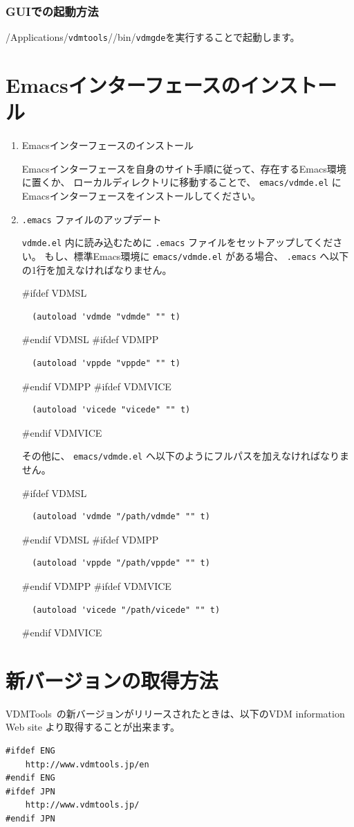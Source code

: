 \documentclass[\pformat,12pt]{jarticle}
\newcommand{\Toolbox}{VDMTools}
\newcommand{\vdmgde}{vdmgde}
\newcommand{\vdmtools}{vdmtools}
\newcommand{\vdmdeNineteenEl}{vdmde.el}
\newcommand{\Toolbox}{VDMTools}
\newcommand{\vdmgde}{vppgde}
\newcommand{\vdmtools}{vdmtools}
\newcommand{\vdmdeNineteenEl}{vppde.el}
\newcommand{\Toolbox}{VDMTools}
\newcommand{\vdmgde}{vicegde}
\newcommand{\vdmtools}{vdmtools}
\newcommand{\vdmdeNineteenEl}{vicede.el}
\newcommand{\Index}[1]{#1\index{#1}}
\begin{document}
\subsubsection{GUIでの起動方法}
/Applications/{\tt \vdmtools}//bin/{\tt \vdmgde}を実行することで起動します。


\newpage
\section{Emacsインターフェースのインストール}
\label{sec:emacsinstall}

\begin{enumerate}
\item Emacsインターフェースのインストール
  
Emacsインターフェースを自身のサイト手順に従って、存在するEmacs環境に置くか、
ローカルディレクトリに移動することで、 {\tt emacs/\Index{\vdmdeNineteenEl}}
にEmacsインターフェースをインストールしてください。

\item  {\tt .emacs} ファイルのアップデート
  
{\tt \vdmdeNineteenEl} 内に読み込むために {\tt .emacs} ファイルをセットアップしてください。
もし、標準Emacs環境に {\tt emacs/\vdmdeNineteenEl} がある場合、 {\tt .emacs} へ以下の1行を加えなければなりません。

#ifdef VDMSL
\begin{verbatim}
  (autoload 'vdmde "vdmde" "" t)
\end{verbatim}
#endif VDMSL
#ifdef VDMPP
\begin{verbatim}
  (autoload 'vppde "vppde" "" t)
\end{verbatim}
#endif VDMPP
#ifdef VDMVICE
\begin{verbatim}
  (autoload 'vicede "vicede" "" t)
\end{verbatim}
#endif VDMVICE

その他に、 {\tt emacs/\vdmdeNineteenEl} へ以下のようにフルパスを加えなければなりません。

#ifdef VDMSL
\begin{verbatim}
  (autoload 'vdmde "/path/vdmde" "" t)
\end{verbatim}
#endif VDMSL
#ifdef VDMPP
\begin{verbatim}
  (autoload 'vppde "/path/vppde" "" t)
\end{verbatim}
#endif VDMPP
#ifdef VDMVICE
\begin{verbatim}
  (autoload 'vicede "/path/vicede" "" t)
\end{verbatim}
#endif VDMVICE
\end{enumerate}

\newpage
\section{新バージョンの取得方法}
\Toolbox\ の新バージョンがリリースされたときは、以下のVDM information \Index{Web site}
より取得することが出来ます。

\begin{verbatim}
#ifdef ENG
    http://www.vdmtools.jp/en
#endif ENG
#ifdef JPN
    http://www.vdmtools.jp/
#endif JPN
\end{verbatim}
\end{document}
